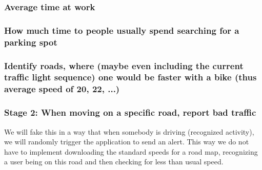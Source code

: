 \subsubsection{Average time at work}
\subsubsection{How much time to people usually spend searching for a parking spot}
\subsubsection{Identify roads, where (maybe even including the current traffic light sequence) one would be faster with a bike (thus average speed of 20, 22, ...)}



\subsubsection{Stage 2: When moving on a specific road, report bad traffic}
We will fake this in a way that when somebody is driving (recognized activity), we will randomly trigger the application to send an alert.
This way we do not have to implement downloading the standard speeds for a road map, recognizing a user being on this road and then checking for less than usual speed.